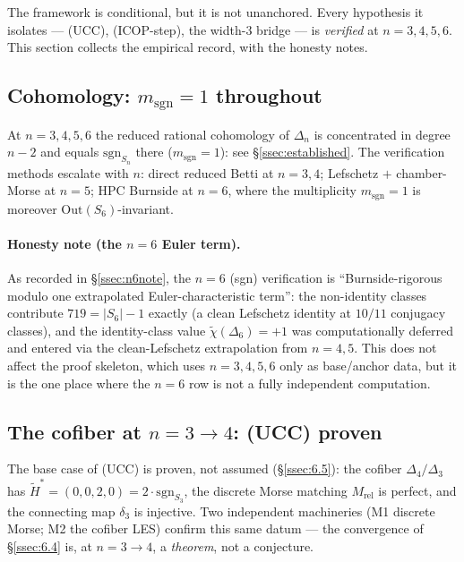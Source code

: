 \documentclass[11pt,reqno]{amsart}
\theoremstyle{plain}
\theoremstyle{definition}
\newcommand{\Hred}{\widetilde H}
\newcommand{\chired}{\widetilde\chi}
\newcommand{\sgn}{\mathrm{sgn}}
\newcommand{\Mrel}{M_{\mathrm{rel}}}
\newcommand{\UCC}{\textup{(UCC)}}
\newcommand{\ICOPstep}{\textup{(ICOP-step)}}
\begin{document}
The framework is conditional, but it is not unanchored. Every
hypothesis it isolates --- \UCC, \ICOPstep, the width-3 bridge --- is
\emph{verified} at $n=3,4,5,6$. This section collects the empirical
record, with the honesty notes.

\subsection{Cohomology: $m_{\sgn}=1$ throughout}\label{ssec:9.1}
At $n=3,4,5,6$ the reduced rational cohomology of $\Delta_n$ is
concentrated in degree $n-2$ and equals $\sgn_{S_n}$ there
($m_{\sgn}=1$): see \S\ref{ssec:established}. The verification methods
escalate with $n$: direct reduced Betti at $n=3,4$; Lefschetz $+$
chamber-Morse at $n=5$; HPC Burnside at $n=6$, where the multiplicity
$m_{\sgn}=1$ is moreover $\mathrm{Out}(S_6)$-invariant.

\paragraph{Honesty note (the $n=6$ Euler term).}
As recorded in \S\ref{ssec:n6note}, the $n=6$ (sgn) verification is
``Burnside-rigorous modulo one extrapolated Euler-characteristic
term'': the non-identity classes contribute $719=|S_6|-1$ exactly (a
clean Lefschetz identity at $10/11$ conjugacy classes), and the
identity-class value $\chired(\Delta_6)=+1$ was computationally
deferred and entered via the clean-Lefschetz extrapolation from
$n=4,5$. This does not affect the proof skeleton, which uses
$n=3,4,5,6$ only as base/anchor data, but it is the one place where the
$n=6$ row is not a fully independent computation.

\subsection{The cofiber at $n=3\to4$: (UCC) proven}\label{ssec:9.2}
The base case of \UCC{} is proven, not assumed (\S\ref{ssec:6.5}): the
cofiber $\Delta_4/\Delta_3$ has $\Hred^*=(0,0,2,0)=2\cdot\sgn_{S_3}$,
the discrete Morse matching $\Mrel$ is perfect, and the connecting map
$\delta_3$ is injective. Two independent machineries (M1 discrete Morse;
M2 the cofiber LES) confirm this same datum --- the convergence of
\S\ref{ssec:6.4} is, at $n=3\to4$, a \emph{theorem}, not a conjecture.
\end{document}
